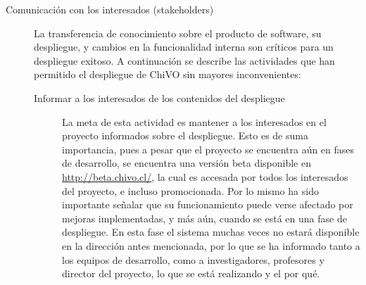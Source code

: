 \begin{description}
	\item [Comunicación con los interesados (stakeholders)] La transferencia de conocimiento sobre el producto de software, su despliegue, y cambios en la funcionalidad interna son críticos para un despliegue exitoso. A continuación se describe las actividades que han permitido el despliegue de ChiVO sin mayores inconvenientes:
		\begin{description}
			\item [Informar a los interesados de los contenidos del despliegue] La meta de esta actividad es mantener a los interesados en el proyecto informados sobre el despliegue. Esto es de suma importancia, pues a pesar que el proyecto se encuentra aún en fases de desarrollo, se encuentra una versión beta\footnotemark{} disponible en \url{http://beta.chivo.cl/}, la cual es accesada por todos los interesados del proyecto, e incluso promocionada. Por lo mismo ha sido importante señalar que su funcionamiento puede verse afectado por mejoras implementadas, y más aún, cuando se está en una fase de despliegue. En esta fase el sistema muchas veces no estará disponible en la dirección antes mencionada, por lo que se ha informado tanto a los equipos de desarrollo, como a investigadores, profesores y director del proyecto, lo que se está realizando y el por qu\'e.


\end{description}
\end{description}
